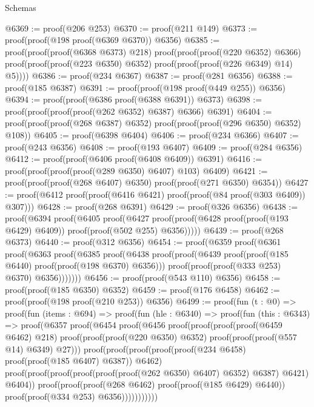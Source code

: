 \begin{lexlean}{Schemas}
\begin{coremodule}
@6369 := proof(@206 @253)
@6370 := proof(@211 @149)
@6373 := proof(proof(@198 proof(@6369 @6370)) @6356)
@6385 := proof(proof(proof(@6368 @6373) @218)
      proof(proof(proof(@220 @6352) @6366)
          proof(proof(proof(@223 @6350) @6352) proof(proof(proof(@226 @6349) @14) @5))))
@6386 := proof(@234 @6367)
@6387 := proof(@281 @6356)
@6388 := proof(@185 @6387)
@6391 := proof(proof(@198 proof(@449 @255)) @6356)
@6394 := proof(proof(@6386 proof(@6388 @6391)) @6373)
@6398 := proof(proof(proof(proof(@262 @6352) @6387) @6366) @6391)
@6404 := proof(proof(proof(@268 @6387) @6352) proof(proof(proof(@296 @6350) @6352) @108))
@6405 := proof(@6398 @6404)
@6406 := proof(@234 @6366)
@6407 := proof(@243 @6356)
@6408 := proof(@193 @6407)
@6409 := proof(@284 @6356)
@6412 := proof(proof(@6406 proof(@6408 @6409)) @6391)
@6416 := proof(proof(proof(proof(@289 @6350) @6407) @103) @6409)
@6421 := proof(proof(proof(@268 @6407) @6350) proof(proof(@271 @6350) @6354))
@6427 := proof(@6412 proof(proof(@6416 @6421) proof(proof(@84 proof(@303 @6409)) @307)))
@6428 := proof(@268 @6391)
@6429 := proof(@326 @6356)
@6438 := proof(@6394
      proof(@6405
          proof(@6427
              proof(proof(@6428 proof(proof(@193 @6429) @6409)) proof(proof(@502 @255) @6356)))))
@6439 := proof(@268 @6373)
@6440 := proof(@312 @6356)
@6454 := proof(@6359
      proof(@6361
          proof(@6363
              proof(@6385
                  proof(@6438
                      proof(proof(@6439 proof(proof(@185 @6440) proof(proof(@198 @6370) @6356)))
                          proof(proof(proof(@333 @253) @6370) @6356)))))))
@6456 := proof(proof(@543 @110) @6356)
@6458 := proof(proof(@185 @6350) @6352)
@6459 := proof(@176 @6458)
@6462 := proof(proof(@198 proof(@210 @253)) @6356)
@6499 := proof(fun (t : @0) =>
    proof(fun (items : @694) =>
      proof(fun (hle : @6340) =>
        proof(fun (this : @6343) =>
          proof(@6357
              proof(@6454
                  proof(@6456
                      proof(proof(proof(proof(@6459 @6462) @218)
                            proof(proof(proof(@220 @6350) @6352)
                                proof(proof(proof(@557 @14) @6349) @27)))
                          proof(proof(proof(proof(proof(@234 @6458) proof(proof(@185 @6407) @6387))
                                  @6462)
                                proof(proof(proof(proof(proof(proof(@262 @6350) @6407) @6352) @6387)
                                      @6421)
                                    @6404))
                              proof(proof(proof(@268 @6462) proof(proof(@185 @6429) @6440))
                                  proof(proof(@334 @253) @6356)))))))))))

\end{coremodule}
\end{lexlean}
